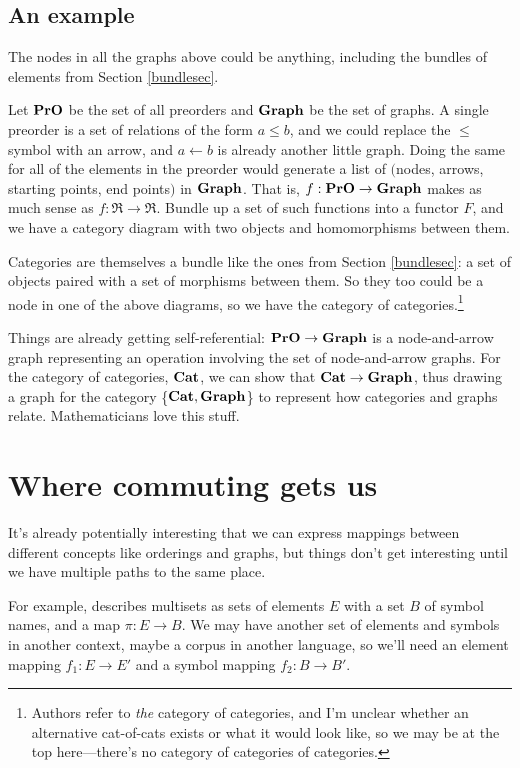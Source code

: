 \documentclass[11pt]{article}
\begin{document}
\subsection{An example}
The nodes in all the graphs above could be anything, including the bundles of elements from
Section \ref{bundlesec}.

Let ${\bf PrO}$ be the set of all preorders and ${\bf Graph}$ be the set of graphs. A
single preorder is a set of relations of the form $a \leq b$, and we could replace the $\leq$
symbol with an arrow, and $a\leftarrow b$ is already another little graph. 
Doing the same for all of the elements in the preorder would generate a list of
$($nodes, arrows, starting points, end points$)$ in ${\bf Graph}$.
That is, $f:{\bf PrO}\to {\bf Graph}$ makes as much sense as $f:\Re \to \Re$. Bundle up
a set of such functions into a functor $F$, and we have a category diagram with two
objects and homomorphisms between them.

Categories are themselves a bundle like the ones from Section \ref{bundlesec}: a set
of objects paired with a set of morphisms between them. So they too could be a node in
one of the above diagrams, so we have the category of categories.\footnote{Authors refer
to {\em the} category of categories, and I'm unclear whether an alternative cat-of-cats
exists or what it would look like, so we may be at the top here---there's no category of
categories of categories.}

Things are already getting self-referential: ${\bf PrO}\to {\bf Graph}$ is a node-and-arrow
graph representing an operation involving the set of node-and-arrow graphs. For the 
category of categories, ${\bf Cat}$, we can show that ${\bf Cat}\to {\bf Graph}$, thus
drawing a graph for the category \{${\bf Cat}, {\bf Graph}$\} to represent how categories and graphs relate.
Mathematicians love this stuff.

\section{Where commuting gets us} It's already potentially interesting that we can
express mappings between different concepts like orderings and graphs, but things don't get
interesting until we have multiple paths to the same place.


For example,
\citet{spivak:category} describes multisets as sets of elements $E$ with a set $B$ of
symbol names, and a map $\pi:E\to B$. We may have another set of elements and symbols in
another context, maybe a corpus in another language, so we'll need an element mapping
$f_1:E\to E'$ and a symbol mapping $f_2:B\to B'$.
\end{document}
